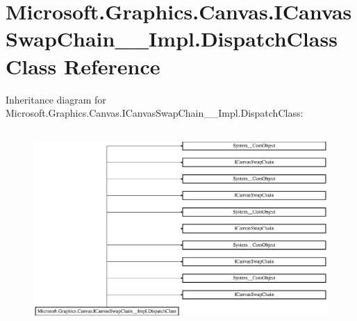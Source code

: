\hypertarget{class_microsoft_1_1_graphics_1_1_canvas_1_1_i_canvas_swap_chain_____impl_1_1_dispatch_class}{}\section{Microsoft.\+Graphics.\+Canvas.\+I\+Canvas\+Swap\+Chain\+\_\+\+\_\+\+Impl.\+Dispatch\+Class Class Reference}
\label{class_microsoft_1_1_graphics_1_1_canvas_1_1_i_canvas_swap_chain_____impl_1_1_dispatch_class}
Inheritance diagram for Microsoft.\+Graphics.\+Canvas.\+I\+Canvas\+Swap\+Chain\+\_\+\+\_\+\+Impl.\+Dispatch\+Class\+:\begin{figure}[H]
\begin{center}
\leavevmode
\includegraphics[height=7.530562cm]{class_microsoft_1_1_graphics_1_1_canvas_1_1_i_canvas_swap_chain_____impl_1_1_dispatch_class}
\end{center}
\end{figure}
